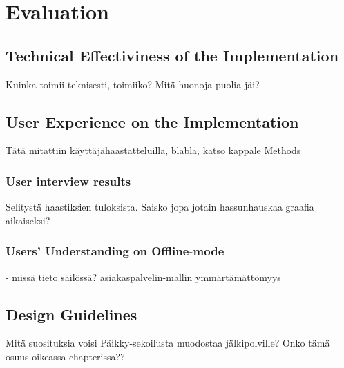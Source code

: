 \chapter{Evaluation}

\section{Technical Effectiviness of the Implementation}


Kuinka toimii teknisesti, toimiiko? Mitä huonoja puolia jäi?



\section{User Experience on the Implementation}
Tätä mitattiin käyttäjähaastatteluilla, blabla, katso kappale Methods

\subsection{User interview results}
Selitystä haastiksien tuloksista. Saisko jopa jotain hassunhauskaa graafia aikaiseksi?


\subsection{Users' Understanding on Offline-mode}
- missä tieto säilössä? asiakaspalvelin-mallin ymmärtämättömyys




\section{Design Guidelines}
Mitä suosituksia voisi Päikky-sekoilusta muodostaa jälkipolville?
Onko tämä osuus oikeassa chapterissa??

